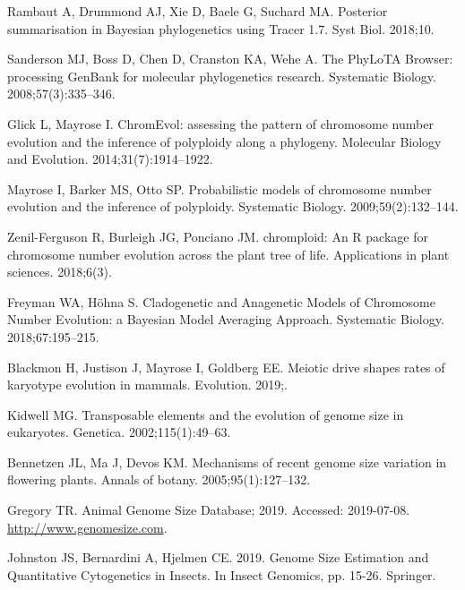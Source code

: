 \documentclass[]{rsos}%
\begin{document}
\begin{thebibliography}{99}
Rambaut A, Drummond AJ, Xie D, Baele G, Suchard MA.
 Posterior summarisation in Bayesian phylogenetics using Tracer 1.7.
 Syst Biol. 2018;10.

Sanderson MJ, Boss D, Chen D, Cranston KA, Wehe A.
 The PhyLoTA Browser: processing GenBank for molecular phylogenetics
  research.
 Systematic Biology. 2008;57(3):335--346.


Glick L, Mayrose I.
 ChromEvol: assessing the pattern of chromosome number evolution and
  the inference of polyploidy along a phylogeny.
 Molecular Biology and Evolution. 2014;31(7):1914--1922.

Mayrose I, Barker MS, Otto SP.
 Probabilistic models of chromosome number evolution and the inference
  of polyploidy.
 Systematic Biology. 2009;59(2):132--144.

Zenil-Ferguson R, Burleigh JG, Ponciano JM.
 chromploid: An R package for chromosome number evolution across the
  plant tree of life.
 Applications in plant sciences. 2018;6(3).
 
Freyman WA, H{\"o}hna S.
 Cladogenetic and Anagenetic Models of Chromosome Number Evolution: a
  {B}ayesian Model Averaging Approach.
 Systematic Biology. 2018;67:195--215.

Blackmon H, Justison J, Mayrose I, Goldberg EE.
 Meiotic drive shapes rates of karyotype evolution in mammals.
 Evolution. 2019;.

Kidwell MG.
 Transposable elements and the evolution of genome size in eukaryotes.
 Genetica. 2002;115(1):49--63.

Bennetzen JL, Ma J, Devos KM.
 Mechanisms of recent genome size variation in flowering plants.
 Annals of botany. 2005;95(1):127--132.

Gregory TR. Animal Genome Size Database; 2019.
 Accessed: 2019-07-08.
 \url{http://www.genomesize.com}.
 
Johnston JS, Bernardini A, Hjelmen CE. 2019. 
Genome Size Estimation and Quantitative Cytogenetics in Insects. In Insect Genomics, pp. 15-26. Springer.


\end{thebibliography}
\end{document}
